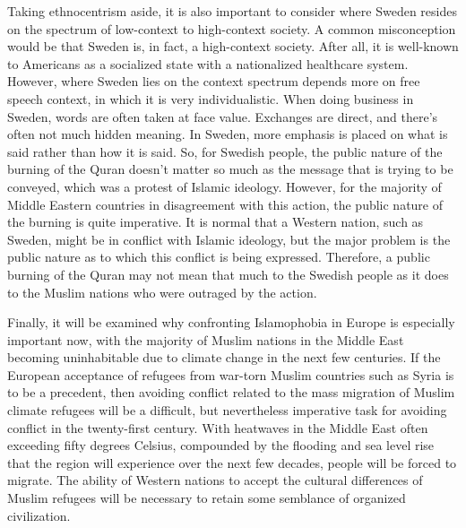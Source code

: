 \documentclass[12pt,letterpaper]{article}
\begin{document}
\begin{flushleft}
Taking ethnocentrism aside, it is also important to consider where Sweden resides on the spectrum of low-context to high-context society. \autocite{christie_peace_2001} A common misconception would be that Sweden is, in fact, a high-context society. After all, it is well-known to Americans as a socialized state with a nationalized healthcare system. However, where Sweden lies on the context spectrum depends more on free speech context, in which it is very individualistic. When doing business in Sweden, words are often taken at face value. Exchanges are direct, and there's often not much hidden meaning. \autocite{altinkaya_cultural_nodate} In Sweden, more emphasis is placed on what is said rather than how it is said. So, for Swedish people, the public nature of the burning of the Quran doesn't matter so much as the message that is trying to be conveyed, which was a protest of Islamic ideology. However, for the majority of Middle Eastern countries in disagreement with this action, the public nature of the burning is quite imperative. It is normal that a Western nation, such as Sweden, might be in conflict with Islamic ideology, but the major problem is the public nature as to which this conflict is being expressed. Therefore, a public burning of the Quran may not mean that much to the Swedish people as it does to the Muslim nations who were outraged by the action.

Finally, it will be examined why confronting Islamophobia in Europe is especially important now, with the majority of Muslim nations in the Middle East becoming uninhabitable due to climate change in the next few centuries. If the European acceptance of refugees from war-torn Muslim countries such as Syria is to be a precedent, then avoiding conflict related to the mass migration of Muslim climate refugees will be a difficult, but nevertheless imperative task for avoiding conflict in the twenty-first century. \autocite{noauthor_arab_nodate} With heatwaves in the Middle East often exceeding fifty degrees Celsius, compounded by the flooding and sea level rise that the region will experience over the next few decades, people will be forced to migrate. \autocite{yabi_climate_nodate} The ability of Western nations to accept the cultural differences of Muslim refugees will be necessary to retain some semblance of organized civilization.


\end{flushleft}
\end{document}

